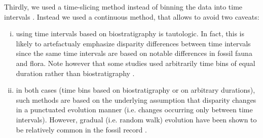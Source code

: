 \documentclass[12pt,letterpaper]{article}
\begin{document}
Thirdly, we used a time-slicing method instead of binning the data into time intervals \citep[e.g in:][]{cisneros2010,prentice2011,Hughes20082013,hopkinsdecoupling2013,bentonmodels2014,bensonfaunal2014}.
Instead we used a continuous method, that allows to avoid two caveats:
\begin{enumerate}[(i)]
    \item using time intervals based on biostratigraphy is tautologic.
    In fact, this is likely to artefactualy emphasize disparity differences between time intervals since the same time intervals are based on notable differences in fossil fauna and flora.
    Note however that some studies used arbitrarily time bins of equal duration rather than biostratigraphy \citep{Butler2012,hopkinsdecoupling2013,bensonfaunal2014}.
    \item in both cases (time bins based on biostratigraphy or on arbitrary durations), such methods are based on the underlying assumption that disparity changes in a punctuated evolution manner (i.e. changes occurring only between time intervals).
    However, gradual (i.e. random walk) evolution have been shown to be relatively common in the fossil record \citep{Hunt20112007,Hunt21042015}.
\end{enumerate}
\end{document}
